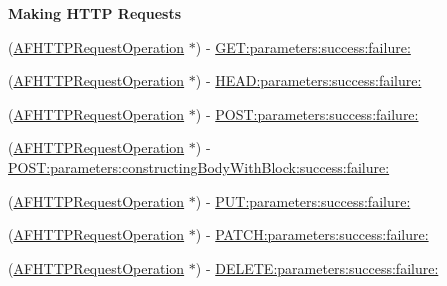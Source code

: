 \begin{Indent}{\bf Making H\+T\+T\+P Requests}\par
{\em 

 

 }\begin{DoxyCompactItemize}
\item 
(\hyperlink{interface_a_f_h_t_t_p_request_operation}{A\+F\+H\+T\+T\+P\+Request\+Operation} $\ast$) -\/ \hyperlink{interface_a_f_h_t_t_p_request_operation_manager_a1a66b4cb1e24d9fd9c82c87ba3c24c86}{G\+E\+T\+:parameters\+:success\+:failure\+:}
\item 
(\hyperlink{interface_a_f_h_t_t_p_request_operation}{A\+F\+H\+T\+T\+P\+Request\+Operation} $\ast$) -\/ \hyperlink{interface_a_f_h_t_t_p_request_operation_manager_a0cfe99563022416bb33f6be78f150268}{H\+E\+A\+D\+:parameters\+:success\+:failure\+:}
\item 
(\hyperlink{interface_a_f_h_t_t_p_request_operation}{A\+F\+H\+T\+T\+P\+Request\+Operation} $\ast$) -\/ \hyperlink{interface_a_f_h_t_t_p_request_operation_manager_a7aeaa999caace9fda5f055964cfc75a8}{P\+O\+S\+T\+:parameters\+:success\+:failure\+:}
\item 
(\hyperlink{interface_a_f_h_t_t_p_request_operation}{A\+F\+H\+T\+T\+P\+Request\+Operation} $\ast$) -\/ \hyperlink{interface_a_f_h_t_t_p_request_operation_manager_a6add0a3b8c7c8d841b8be0b7d13d303a}{P\+O\+S\+T\+:parameters\+:constructing\+Body\+With\+Block\+:success\+:failure\+:}
\item 
(\hyperlink{interface_a_f_h_t_t_p_request_operation}{A\+F\+H\+T\+T\+P\+Request\+Operation} $\ast$) -\/ \hyperlink{interface_a_f_h_t_t_p_request_operation_manager_ad85b90546a5ac1e0c7a4ef37d3f3511d}{P\+U\+T\+:parameters\+:success\+:failure\+:}
\item 
(\hyperlink{interface_a_f_h_t_t_p_request_operation}{A\+F\+H\+T\+T\+P\+Request\+Operation} $\ast$) -\/ \hyperlink{interface_a_f_h_t_t_p_request_operation_manager_ae2a0d5470a868d90260dadde88d17fb3}{P\+A\+T\+C\+H\+:parameters\+:success\+:failure\+:}
\item 
(\hyperlink{interface_a_f_h_t_t_p_request_operation}{A\+F\+H\+T\+T\+P\+Request\+Operation} $\ast$) -\/ \hyperlink{interface_a_f_h_t_t_p_request_operation_manager_a8726ec2b42a8ef67da35c6027f135bb0}{D\+E\+L\+E\+T\+E\+:parameters\+:success\+:failure\+:}
\end{DoxyCompactItemize}
\end{Indent}
